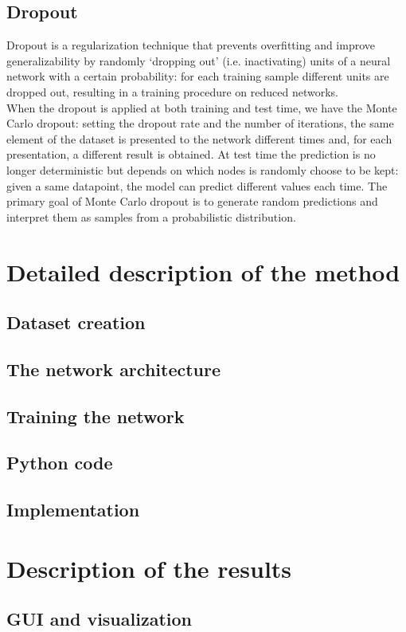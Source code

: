 \documentclass[12pt]{article}
\begin{document}
\subsection{Dropout}
Dropout is a regularization technique that prevents overfitting and improve generalizability by randomly ‘dropping out’ (i.e. inactivating) units of a neural network with a certain probability: for each training sample different units are dropped out, resulting in a training procedure on reduced networks. \cite{2}
\\ When the dropout is applied at both training and test time, we have the Monte Carlo dropout: setting the dropout rate and the number of iterations, the same element of the dataset is presented to the network different times and, for each presentation, a different result is obtained. At test time the prediction is no longer deterministic but depends on which nodes is randomly choose to be kept: given a same datapoint, the model can predict different values each time. The primary goal of Monte Carlo dropout is to generate random predictions and interpret them as samples from a probabilistic distribution. \cite{3}
\section{Detailed description of the method}
\subsection{Dataset creation}

\subsection{The network architecture}
\subsection{Training the network}
\subsection{Python code}
\subsection{Implementation}
\section{Description of the results}
\subsection{GUI and visualization}
\end{document}
